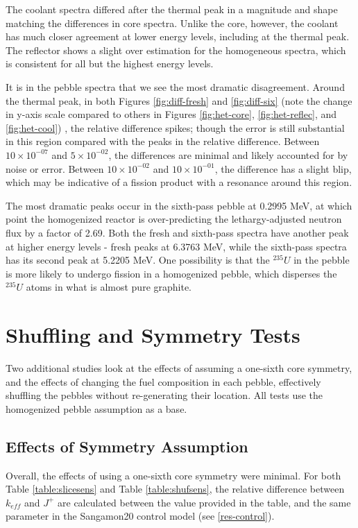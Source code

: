 The coolant spectra differed after the thermal peak in a magnitude and shape matching the differences in core spectra.  Unlike the core, however, the coolant has much closer agreement at lower energy levels, including at the thermal peak.  The reflector shows a slight over estimation for the homogeneous spectra, which is consistent for all but the highest energy levels.

It is in the pebble spectra that we see the most dramatic disagreement.  Around the thermal peak, in both Figures \ref{fig:diff-fresh} and \ref{fig:diff-six} (note the change in y-axis scale compared to others in Figures \ref{fig:het-core}, \ref{fig:het-reflec}, and \ref{fig:het-cool}) , the relative difference spikes; though the error is still substantial in this region compared with the peaks in the relative difference.  Between $10\times10^{-07}$ and $5\times10^{-02}$, the differences are minimal and likely accounted for by noise or error.  Between $10\times10^{-02}$ and $10\times10^{-01}$, the difference has a slight blip, which may be indicative of a fission product with a resonance around this region.

The most dramatic peaks occur in the sixth-pass pebble at 0.2995 MeV, at which point the homogenized reactor is over-predicting the lethargy-adjusted neutron flux by a factor of 2.69.  Both the fresh and sixth-pass spectra have another peak at higher energy levels - fresh peaks at 6.3763 MeV, while the sixth-pass spectra has its second peak at 5.2205 MeV.  One possibility is that the $^{235}U$ in the pebble is more likely to undergo fission in a homogenized pebble, which disperses the $^{235}U$ atoms in what is almost pure graphite.



\section{Shuffling and Symmetry Tests}
Two additional studies look at the effects of assuming a one-sixth core symmetry, and the effects of changing the fuel composition in each pebble, effectively shuffling the pebbles without re-generating their location.  All tests use the homogenized pebble assumption as a base.

\subsection{Effects of Symmetry Assumption}
\label{res-sym}

Overall, the effects of using a one-sixth core symmetry were minimal.  For both Table \ref{table:slicesens} and Table \ref{table:shufsens}, the relative difference between $k_{eff}$ and $J^+$ are calculated between the value provided in the table, and the same parameter in the Sangamon20 control model (see \autoref{res-control}).



